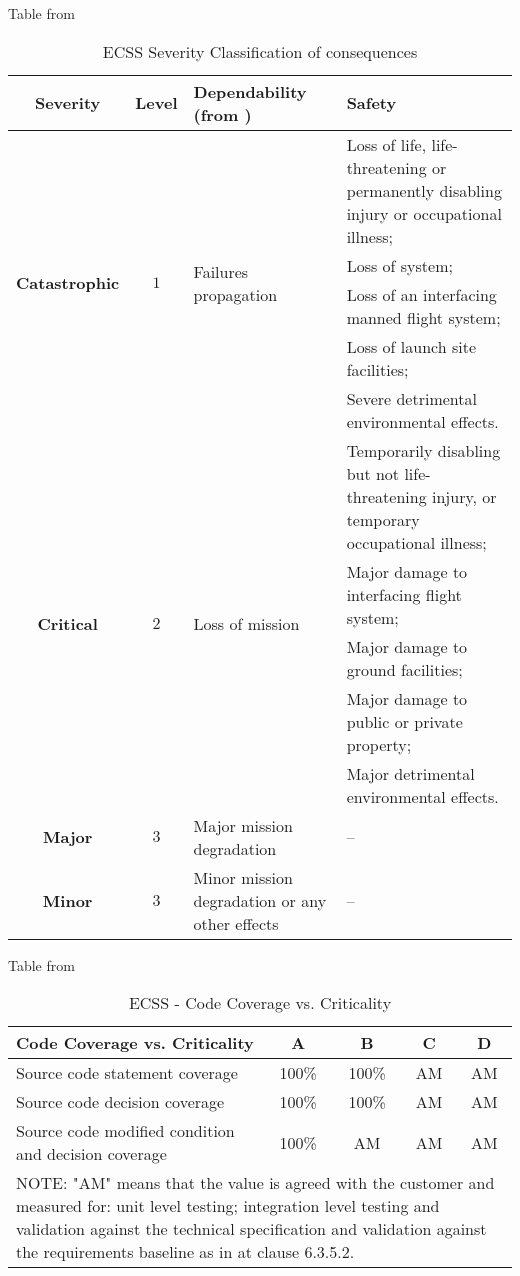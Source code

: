 {Table from \cite{ecss-q-st-40c}
\begin{table}[!ht]
\centering
\noindent \begin{tabular}{|c|c|m{4cm}|m{5cm}|}\hline
\textbf{Severity} & \textbf{Level} & \textbf{Dependability (from \cite{ecss-q-st-30c})} & \textbf{Safety}\\\hline\hline
\multirow{5}{*}{\textbf{Catastrophic}} & \multirow{5}{*}{$1$} & \multirow{5}{*}{Failures propagation} & 
Loss of life, life-threatening or permanently disabling injury or occupational illness;\\\cline{4-4}
& & & Loss of system;  \\ \cline{4-4}
& & & Loss of an interfacing manned flight system; \\ \cline{4-4}
& & & Loss of launch site facilities;  \\ \cline{4-4}
& & & Severe detrimental environmental effects.  \\\hline\hline
\multirow{5}{*}{\textbf{Critical}} & \multirow{5}{*}{$2$} & \multirow{5}{*}{Loss of mission} & 
Temporarily disabling but not life-threatening injury, or temporary occupational illness;\\\cline{4-4}
& & & Major damage to interfacing flight system;  \\ \cline{4-4}
& & & Major damage to ground facilities; \\ \cline{4-4}
& & & Major damage to public or private property;  \\ \cline{4-4}
& & & Major detrimental environmental effects.  \\\hline\hline
\textbf{Major} & $3$ & Major mission degradation & --\\\hline\hline
\textbf{Minor} & $3$ & Minor mission degradation or any other effects & --\\\hline
\end{tabular}
\caption{\protect\ac{ECSS} Severity Classification of consequences}\label{tab:severity}
\end{table}

Table from \cite{ecss-q-st-40c}
\begin{table}[!ht]
\centering
\noindent \begin{tabular}{|m{6cm}|c|c|c|c|}
\hline
\textbf{Code Coverage vs. Criticality} & A & B & C & D \\\hline
Source code statement coverage & 100\% & 100\% & AM & AM \\\hline
Source code decision coverage & 100\% & 100\% & AM & AM \\\hline
Source code modified condition and decision coverage & 100\% & AM & AM & AM \\\hline
\multicolumn{5}{|m{14cm}|}{
NOTE: "AM" means that the value is agreed with the customer and measured for:
unit level testing; integration level testing and validation against the
technical specification and validation against the requirements baseline
as in \cite{ecss-q-st-80c} at clause 6.3.5.2.
}\\\hline
\end{tabular}
\caption{\protect\ac{ECSS} - Code Coverage vs. Criticality}\label{tab:ccoverage}
\end{table}

}
